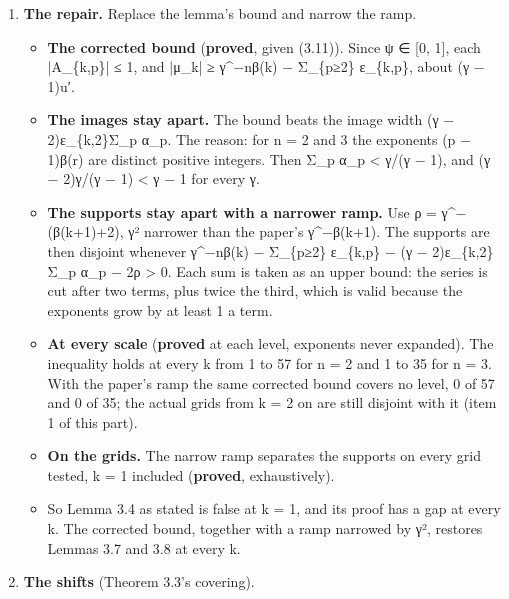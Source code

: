 \begin{enumerate}
\begin{itemize}
\item The proof first bounds (3.11), μ with each α\_\allowbreak{}p cut to its first k terms, α\_\allowbreak{}p − ε\_\allowbreak{}\{k,p\}. That bound holds: its least gap on every grid tested is the last column, at least the margin, and exactly on it at k = 1.
\item It then says the tails Σ\_\allowbreak{}p ε\_\allowbreak{}\{k,p\}A\_\allowbreak{}\{k,p\}, with A\_\allowbreak{}\{k,p\} = ψ(d\_\allowbreak{}p) − ψ(d′\_\allowbreak{}p), are “too small to annihilate” γ\textasciicircum{}−nβ(k). That is true, and it does not keep |μ\_\allowbreak{}k| at or above γ\textasciicircum{}−nβ(k): at k = 1 the tails pull it from 10 units to 9.0999099….
\item So the lemma's bound fails at k = 1. At every k the proof's last step does not prove it.
\end{itemize}
\item \textbf{The repair.} Replace the lemma's bound and narrow the ramp.

\begin{itemize}
\item \textbf{The corrected bound} (\textbf{proved}, given (3.11)). Since ψ ∈ [0, 1], each |A\_\allowbreak{}\{k,p\}| ≤ 1, and |μ\_\allowbreak{}k| ≥ γ\textasciicircum{}−nβ(k) − Σ\_\allowbreak{}\{p≥2\} ε\_\allowbreak{}\{k,p\}, about (γ − 1)u′.
\item \textbf{The images stay apart.} The bound beats the image width (γ − 2)ε\_\allowbreak{}\{k,2\}Σ\_\allowbreak{}p α\_\allowbreak{}p. The reason: for n = 2 and 3 the exponents (p − 1)β(r) are distinct positive integers. Then Σ\_\allowbreak{}p α\_\allowbreak{}p < γ/(γ − 1), and (γ − 2)γ/(γ − 1) < γ − 1 for every γ.
\item \textbf{The supports stay apart with a narrower ramp.} Use ρ = γ\textasciicircum{}−(β(k+1)+2), γ² narrower than the paper's γ\textasciicircum{}−β(k+1). The supports are then disjoint whenever γ\textasciicircum{}−nβ(k) − Σ\_\allowbreak{}\{p≥2\} ε\_\allowbreak{}\{k,p\} − (γ − 2)ε\_\allowbreak{}\{k,2\}Σ\_\allowbreak{}p α\_\allowbreak{}p − 2ρ > 0. Each sum is taken as an upper bound: the series is cut after two terms, plus twice the third, which is valid because the exponents grow by at least 1 a term.
\item \textbf{At every scale} (\textbf{proved} at each level, exponents never expanded). The inequality holds at every k from 1 to 57 for n = 2 and 1 to 35 for n = 3. With the paper's ramp the same corrected bound covers no level, 0 of 57 and 0 of 35; the actual grids from k = 2 on are still disjoint with it (item 1 of this part).
\item \textbf{On the grids.} The narrow ramp separates the supports on every grid tested, k = 1 included (\textbf{proved}, exhaustively).
\item So Lemma 3.4 as stated is false at k = 1, and its proof has a gap at every k. The corrected bound, together with a ramp narrowed by γ², restores Lemmas 3.7 and 3.8 at every k.
\end{itemize}
\item \textbf{The shifts} (Theorem 3.3's covering).


\end{enumerate}
